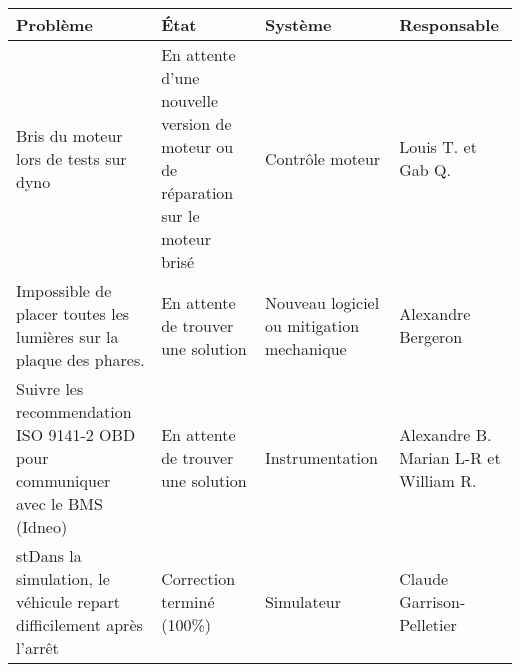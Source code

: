 \begin{tabularx}{\linewidth}{
    |>{\hsize=1.5\hsize}X|%
    >{\hsize=0.5\hsize}X|%
    >{\hsize=0.5\hsize}X|%
    >{\hsize=0.5\hsize}X|%
  }
    \hline
    \textbf{Problème} & \textbf{État} & \textbf{Système} & \textbf{Responsable}\\\hline
    Bris du moteur lors de tests sur dyno & En attente d'une nouvelle version de moteur ou de réparation sur le moteur brisé & Contrôle moteur & Louis T. et Gab Q.\\\hline
   Impossible de placer toutes les lumières sur la plaque des phares. & En attente de trouver une solution & Nouveau logiciel ou mitigation mechanique & Alexandre Bergeron \\\hline %
   Suivre les recommendation ISO 9141-2 OBD pour communiquer avec le BMS (Idneo) & En attente de trouver une solution & Instrumentation & Alexandre B. Marian L-R et William R.\\\hline %
   st{Dans la simulation, le véhicule repart difficilement après l'arrêt} & Correction terminé (100\%) & Simulateur & Claude Garrison-Pelletier\\\hline %
  \end{tabularx}
    
    
